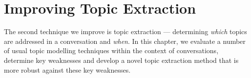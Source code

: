 \chapter[Topic Extraction]{Improving Topic Extraction\label{cpt: method topic extraction}}
The second technique we improve is topic extraction --- determining \textit{which} topics are addressed in a conversation and \textit{when}. In this chapter, we evaluate a number of usual topic modelling techniques within the context of conversations, determine key weaknesses and develop a novel topic extraction method that is more robust against these key weaknesses.






\glsresetall